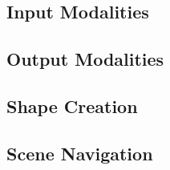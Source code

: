 
\subsection{Input Modalities}


\subsection{Output Modalities}


\subsection{Shape Creation}


\subsection{Scene Navigation}

